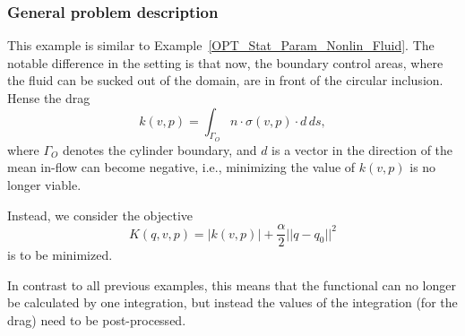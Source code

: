 \subsubsection{General problem description}
This example is similar to Example~\ref{OPT_Stat_Param_Nonlin_Fluid}.
The notable difference in the setting is that now, the boundary control areas, 
where the fluid can be sucked out of the domain, are in front of the 
circular inclusion. Hense the drag
\[
k(v,p) = \int_{\Gamma_O} n\cdot \sigma(v,p)\cdot d \, ds,
\]
where $\Gamma_O$ denotes the cylinder boundary, and $d$ is a vector in the
direction of the mean in-flow can become negative, i.e., minimizing the 
value of $k(v,p)$ is no longer viable. 

Instead, we consider the objective 
\[
K(q,v,p) = |k(v,p)| + \frac{\alpha}{2}||q - q_0||^2
\] 
is to be minimized.

In contrast to all previous examples, this means that the functional can
no longer be calculated by one integration, but instead the values of the 
integration (for the drag) need to be post-processed.

